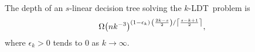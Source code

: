 \begin{theorem}
The depth of an $s$-linear decision tree solving the \(k\)-LDT\ problem is
\begin{displaymath}
{\Omega\mleft(nk^{-3}\mright)}^{
	(1-\epsilon_k)
	\,
	{\left(\frac{2k-s}{2}\right)}
	/
	{\left\lceil\frac{s-k+1}{2}\right\rceil}
},
\end{displaymath}
where \(\epsilon_k > 0\) tends to \(0\) as \(k \to\infty\).
\end{theorem}
